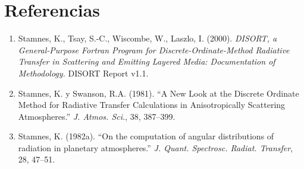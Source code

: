 \documentclass[a4paper,11pt]{article}
\begin{document}
\section*{Referencias}

\begin{enumerate}
\item Stamnes, K., Tsay, S.-C., Wiscombe, W., Laszlo, I. (2000). \textit{DISORT, a General-Purpose Fortran Program for Discrete-Ordinate-Method Radiative Transfer in Scattering and Emitting Layered Media: Documentation of Methodology.} DISORT Report v1.1.
\item Stamnes, K. y Swanson, R.A. (1981). ``A New Look at the Discrete Ordinate Method for Radiative Transfer Calculations in Anisotropically Scattering Atmospheres.'' \textit{J. Atmos. Sci.}, 38, 387--399.
\item Stamnes, K. (1982a). ``On the computation of angular distributions of radiation in planetary atmospheres.'' \textit{J. Quant. Spectrosc. Radiat. Transfer}, 28, 47--51.
\end{enumerate}
\end{document}
